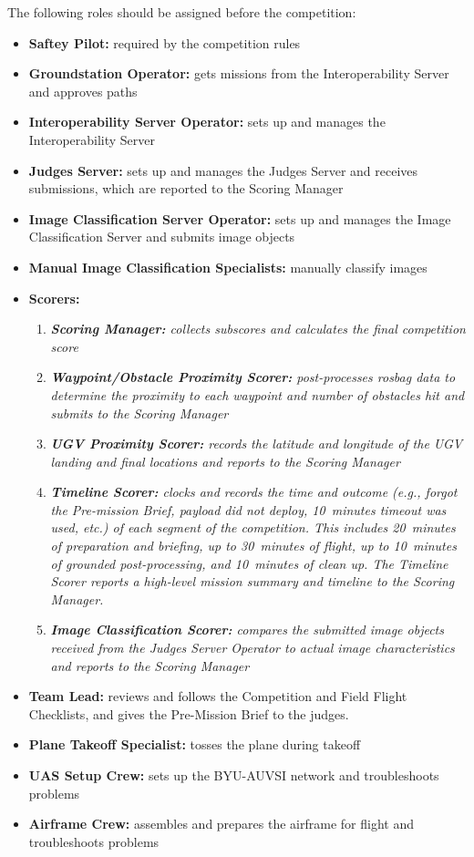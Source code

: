 \documentclass[]{auvsi_doc}
\begin{document}
The following roles should be assigned before the competition:
\begin{itemize}
  \item \textbf{Saftey Pilot:} required by the competition rules
  \item \textbf{Groundstation Operator:} gets missions from the Interoperability Server and approves paths
  \item \textbf{Interoperability Server Operator:} sets up and manages the Interoperability Server
  \item \textbf{Judges Server:} sets up and manages the Judges Server and receives submissions, which are reported to the Scoring Manager
  \item \textbf{Image Classification Server Operator:} sets up and manages the Image Classification Server and submits image objects
  \item \textbf{Manual Image Classification Specialists:} manually classify images
  \item \textbf{Scorers:}
    \begin{enumerate}
      \item \textit{\textbf{Scoring Manager:} collects subscores and calculates the final competition score}
      \item \textit{\textbf{Waypoint/Obstacle Proximity Scorer:} post-processes rosbag data to determine the proximity to each waypoint and number of obstacles hit and submits to the Scoring Manager}
      \item \textit{\textbf{UGV Proximity Scorer:} records the latitude and longitude of the UGV landing and final locations and reports to the Scoring Manager}
      \item \textit{\textbf{Timeline Scorer:} clocks and records the time and outcome (e.g., forgot the Pre-mission Brief, payload did not deploy, 10~minutes timeout was used, etc.) of each segment of the competition. This includes 20~minutes of preparation and briefing, up to 30~minutes of flight, up to 10~minutes of grounded post-processing, and 10~minutes of clean up. The Timeline Scorer reports a high-level mission summary and timeline to the Scoring Manager.}
      \item \textit{\textbf{Image Classification Scorer:} compares the submitted image objects received from the Judges Server Operator to actual image characteristics and reports to the Scoring Manager}
    \end{enumerate}
  \item \textbf{Team Lead:} reviews and follows the Competition and Field Flight Checklists, and gives the Pre-Mission Brief to the judges.
  \item \textbf{Plane Takeoff Specialist:} tosses the plane during takeoff
  \item \textbf{UAS Setup Crew:} sets up the BYU-AUVSI network and troubleshoots problems
  \item \textbf{Airframe Crew:} assembles and prepares the airframe for flight and troubleshoots problems
\end{itemize}
\end{document}
